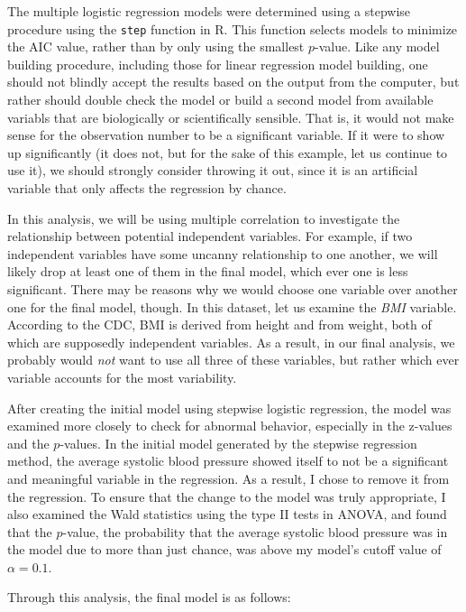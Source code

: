 \documentclass[letter,12pt]{article}
\begin{document}
	The multiple logistic regression models were determined using a stepwise procedure using the \verb|step| function in R. This function selects models to minimize the AIC value, rather than by only using the smallest $p$-value. Like any model building procedure, including those for linear regression model building, one should not blindly accept the results based on the output from the computer, but rather should double check the model or build a second model from available variabls that are biologically or scientifically sensible. That is, it would not make sense for the observation number to be a significant variable. If it were to show up significantly (it does not, but for the sake of this example, let us continue to use it), we should strongly consider throwing it out, since it is an artificial variable that only affects the regression by chance.\par
	In this analysis, we will be using multiple correlation to investigate the relationship between potential independent variables. For example, if two independent variables have some uncanny relationship to one another, we will likely drop at least one of them in the final model, which ever one is less significant. There may be reasons why we would choose one variable over another one for the final model, though. In this dataset, let us examine the \textit{BMI} variable. According to the CDC, BMI is derived from height and from weight, both of which are supposedly independent variables. As a result, in our final analysis, we probably would \textit{not} want to use all three of these variables, but rather which ever variable accounts for the most variability.\par
	After creating the initial model using stepwise logistic regression, the model was examined more closely to check for abnormal behavior, especially in the z-values and the $p$-values. In the initial model generated by the stepwise regression method, the average systolic blood pressure showed itself to not be a significant and meaningful variable in the regression. As a result, I chose to remove it from the regression. To ensure that the change to the model was truly appropriate, I also examined the Wald statistics using the type II tests in ANOVA, and found that the $p$-value, the probability that the average systolic blood pressure was in the model due to more than just chance, was above my model's cutoff value of $\alpha = 0.1$.\par
	Through this analysis, the final model is as follows:
\end{document}

